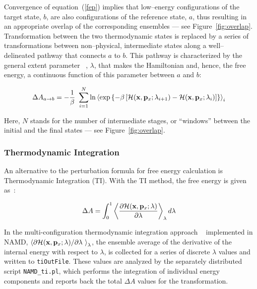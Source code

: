 Convergence of equation~({\ref{fep}}) implies that low--energy configurations
of the target state, $b$, are also configurations of the reference state, $a$,
thus resulting in an appropriate overlap of the corresponding ensembles --- see
Figure~\ref{fig:overlap}.  Transformation between the two
thermodynamic states is replaced by a series of transformations between
non--physical, intermediate states along a well--delineated pathway that
connects $a$ to $b$. This pathway is characterized by the general extent
parameter ~\cite{Beveridge1989,King1993,Kirkwood1935,Mark1998}, $\lambda$, that
makes the Hamiltonian and, hence, the free energy, a continuous function of
this parameter between $a$ and $b$:


\begin{equation}
\Delta A_{a \rightarrow b} = -\frac{1}{\beta} \ \sum_{i = 1}^N \ln
                              \left\langle \exp\left\{-\beta
                                               \left[{\cal H}({\bf x}, {\bf p}_x; \lambda_{i+1}) -
                                                     {\cal H}({\bf x}, {\bf p}_x; \lambda_i)
                                               \right]
                                               \right\}
                                               \right\rangle_i
\label{windows}
\end{equation}


Here, $N$ stands for the number of intermediate stages, or ``windows''
between the initial and the final states --- see Figure~\ref{fig:overlap}.



\subsubsection{Thermodynamic Integration }

An alternative to the perturbation formula for free energy calculation is
Thermodynamic Integration (TI). With the TI method, the free energy is given
as~\cite{Kirkwood1935,Straatsma1991,Frenkel2002}:


\begin{equation}
\Delta A =  \int_0^1 \left<\frac{\partial
{\cal H}({\bf x}, {\bf p}_x; \lambda)}{\partial \lambda}\right>_\lambda d\lambda
\end{equation}


In the multi-configuration thermodynamic integration approach
~\cite{Straatsma1991} implemented in NAMD, $ \left<\partial {\cal H}({\bf x},
{\bf p}_x; \lambda) / \partial \lambda~\right>_\lambda $, the ensemble average
of the derivative of the internal energy with respect to $\lambda$, is
collected for a series of discrete $\lambda$ values and written to {\tt tiOutFile}. These values are analyzed by the separately distributed script
{\tt NAMD\_ti.pl}, which performs the integration of individual energy
components and reports back the total $\Delta A$ values for the transformation.



